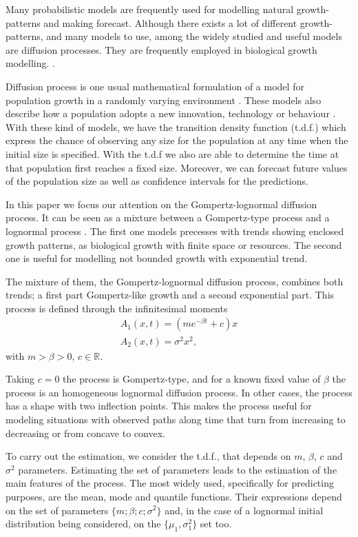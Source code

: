\documentclass{sig-alternate}
\begin{document}
Many probabilistic models are frequently used for modelling natural growth-patterns and making forecast. Although there exists a lot of different growth-patterns, and many models to use, among the widely studied and useful models are diffusion processes. They are frequently employed in biological growth modelling. \cite{lognormal}.

Diffusion process is one usual mathematical formulation of a model for population growth in a randomly
varying environment \cite{lognormal}. These models also describe how a population adopts a new innovation, technology or behaviour \cite{Myrskyla2013}. With these kind of models, we have the transition density function (t.d.f.) which express the chance of observing
any size for the population at any time when the initial size is specified. With the t.d.f we also are able to determine the time at that population first reaches a fixed size. Moreover, we can forecast future values of the population size as well as confidence intervals for the predictions.

In this paper we focus our attention on the Gompertz-lognormal diffusion process. It can be seen as a mixture between a Gompertz-type process \cite{Gut07b} and a lognormal process \cite{GutCy}. The first one models precesses with trends showing enclosed growth patterns, as biological growth with finite space or resources. The second one is useful for modelling not bounded growth with exponential trend.

The mixture of them, the Gompertz-lognormal diffusion process, combines both trends; a first part Gompertz-like growth and a second exponential part. This process is defined through the infinitesimal moments
\[
\begin{array}{l}
A_1(x,t)=(m e^{-\beta t}+c)x \\
A_2(x,t)=\sigma^2 x^2,
\end{array}
\]
with $m > \beta > 0$, $c\in \mathbb{R}$.

Taking $c=0$ the process is Gompertz-type, and for a known fixed value of $\beta$ the process is an homogeneous lognormal diffusion process. In other cases, the process has a shape with two inflection points. This makes the process useful for modeling situations with observed paths along time that turn from increasing to decreasing or from concave to convex.

To carry out the estimation, we consider the t.d.f., that depends on $m$, $\beta$, $c$ and $\sigma^2$ parameters. Estimating the set of parameters leads to the estimation of the main features of the process. The most widely used, specifically for predicting purposes, are the mean, mode and quantile functions. Their expressions depend on the set of parameters $\{m;\beta; c; \sigma^2\}$ and, in the case of a lognormal initial distribution being considered, on the $\{ \mu_1, \sigma_1^2 \}$ set too.
\end{document}
